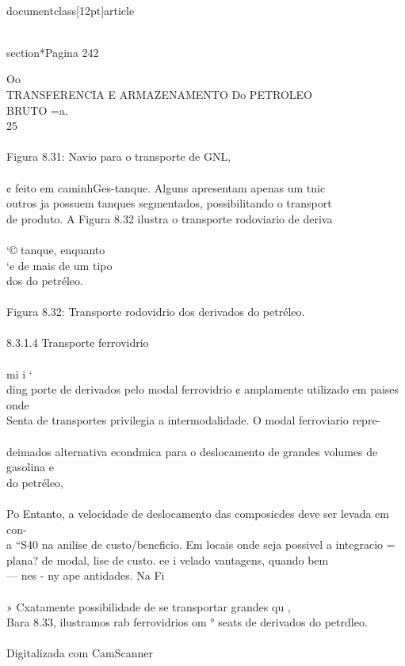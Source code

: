 \\documentclass[12pt]{article}
\begin{document}
\\section*{Pagina 242}

Oo\\
TRANSFERENCIA E ARMAZENAMENTO Do PETROLEO\\
BRUTO =a.\\
25\\
\\
Figura 8.31: Navio para o transporte de GNL,\\
\\
¢ feito em caminhGes-tanque. Alguns apresentam apenas um tnic\\
outros ja possuem tanques segmentados, possibilitando o transport\\
de produto. A Figura 8.32 ilustra o transporte rodoviario de deriva\\
\\
‘© tanque, enquanto\\
‘e de mais de um tipo\\
dos do petréleo.\\
\\
Figura 8.32: Transporte rodovidrio dos derivados do petréleo.\\
\\
8.3.1.4 Transporte ferrovidrio\\
\\
mi i ‘\\
ding porte de derivados pelo modal ferrovidrio ¢ amplamente utilizado em paises onde\\
Senta de transportes privilegia a intermodalidade. O modal ferroviario repre-\\
\\
deimados alternativa econdmica para o deslocamento de grandes volumes de gasolina e\\
do petréleo,\\
\\
Po Entanto, a velocidade de deslocamento das composicdes deve ser levada em con-\\
a “S40 na anilise de custo/beneficio. Em locais onde seja possivel a integracio =\\
plana? de modal, lise de custo. ee i velado vantagens, quando bem\\
— nes - ny ape antidades. Na Fi\\
\\
» Cxatamente possibilidade de se transportar grandes qu ,\\
Bara 8.33, ilustramos rab ferrovidrios om ° seats de derivados do petrdleo.\\
\\
Digitalizada com CamScanner\\
\end{document}
